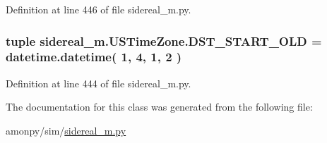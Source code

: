 Definition at line 446 of file sidereal\-\_\-m.\-py.

\hypertarget{classsidereal__m_1_1_u_s_time_zone_a41cb20c9dbc1698a3b8a86320954b021}{
\subsubsection[{D\-S\-T\-\_\-\-S\-T\-A\-R\-T\-\_\-\-O\-L\-D}]{\setlength{\rightskip}{0pt plus 5cm}tuple sidereal\-\_\-m.\-U\-S\-Time\-Zone.\-D\-S\-T\-\_\-\-S\-T\-A\-R\-T\-\_\-\-O\-L\-D = datetime.\-datetime( 1, 4, 1, 2 )\hspace{0.3cm}{\ttfamily [static]}}}\label{classsidereal__m_1_1_u_s_time_zone_a41cb20c9dbc1698a3b8a86320954b021}


Definition at line 444 of file sidereal\-\_\-m.\-py.



The documentation for this class was generated from the following file\-:\begin{DoxyCompactItemize}
\item 
amonpy/sim/\hyperlink{sidereal__m_8py}{sidereal\-\_\-m.\-py}\end{DoxyCompactItemize}
